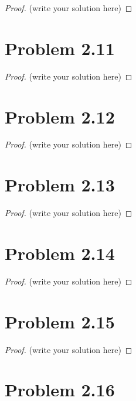 \documentclass[12pt]{article}
\begin{document}
\begin{proof}
	(write your solution here)
\end{proof}

\newpage 

\section{Problem 2.11}

\begin{proof}
	(write your solution here)
\end{proof}

\newpage 

\section{Problem 2.12}

\begin{proof}
	(write your solution here)
\end{proof}

\newpage 

\section{Problem 2.13}

\begin{proof}
	(write your solution here)
\end{proof}

\newpage 

\section{Problem 2.14}

\begin{proof}
	(write your solution here)
\end{proof}

\newpage 

\section{Problem 2.15}

\begin{proof}
	(write your solution here)
\end{proof}

\newpage 

\section{Problem 2.16}
\end{document}

